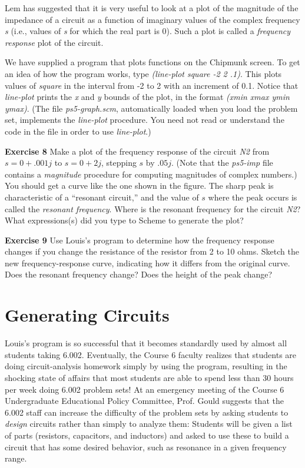 Lem has suggested that it is very useful to look at a plot of the
magnitude of the impedance of a circuit as a function of imaginary
values of the complex frequency {\it s} (i.e., values of {\it s} for which
the real part is 0).  Such a plot is called a {\it frequency response}
plot of the circuit.

We have supplied a program that plots functions on the Chipmunk screen.  To get
an idea of how the program works, type {\it (line-plot square -2 2 .1)}.  This
plots values of {\it square} in the interval from -2 to 2 with an increment of
0.1.  Notice that {\it line-plot} prints the {\it x} and {\it y} bounds of the
plot, in the format {\it (xmin xmax ymin ymax)}.  (The file {\it
ps5-graph.scm}, automatically loaded when you load the problem set, implements
the {\it line-plot} procedure.  You need not read or understand the code in the
file in order to use {\it line-plot}.)

\begin{minipage}[t]{\linewidth}
{\bf Exercise 8}
Make a plot of the frequency response of the circuit {\it N2} from
$s=0+.001j$ to $s=0+2j$, stepping $s$ by $.05j$.  (Note that
the {\it ps5-imp} file contains a {\it magnitude} procedure for computing
magnitudes of complex numbers.)  You should get a curve like the one
shown in the figure.  The sharp peak is characteristic of a ``resonant
circuit,'' and the value of $s$ where the peak occurs is called the
{\it resonant frequency}.  Where is the resonant frequency for the
circuit {\it N2}?  What expressions(s) did you type to Scheme to
generate the plot?

\vspace{4.5in}
\end{minipage}

{\bf Exercise 9}
Use Louis's program to determine how the frequency response changes
if you change the resistance of the resistor from 2 to 10 ohms.
Sketch the new frequency-response curve, indicating how it differs
from the original curve.
Does the resonant frequency change?  Does the height of the peak
change?


\section{Generating Circuits}

Louis's program is so successful that it becomes standardly used by
almost all students taking 6.002.  Eventually, the Course 6 faculty
realizes that students are doing circuit-analysis homework simply by
using the program, resulting in the shocking state of affairs that
most students are able to spend less than 30 hours per week doing
6.002 problem sets!  At an emergency meeting of the Course 6
Undergraduate Educational Policy Committee, Prof. Gould suggests that
the 6.002 staff can increase the difficulty of the problem sets by
asking students to {\it design} circuits rather than simply to analyze
them: Students will be given a list of parts (resistors, capacitors,
and inductors) and asked to use these to build a circuit that has some
desired behavior, such as resonance in a given frequency range.

